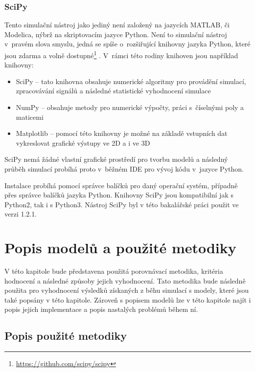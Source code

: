\subsection{SciPy}
\label{chapter-scipy}
Tento simulační nástroj jako jediný není založený na jazycích MATLAB, či Modelica, nýbrž na skriptovacím jazyce Python. Není to simulační nástroj v~pravém slova smyslu, jedná se spíše o~rozšiřující knihovny jazyka Python, které jsou zdarma a volně dostupné\footnote{\url{https://github.com/scipy/scipy}} \cite{scipy}. V~rámci této rodiny knihoven jsou například knihovny:
\begin{itemize}
    \item SciPy -- tato knihovna obsahuje numerické algoritmy pro provádění simulací, zpracovávání signálů a následné statistické vyhodnocení simulace
    \item NumPy -- obsahuje metody pro numerické výpočty, práci s~číselnými poly a maticemi
    \item Matplotlib -- pomocí této knihovny je možné na základě vstupních dat vykreslovat grafické výstupy ve 2D a i ve 3D
\end{itemize}

SciPy nemá žádné vlastní grafické prostředí pro tvorbu modelů a následný průběh simulací probíhá proto v~běžném IDE pro vývoj kódu v~jazyce Python. 

Instalace probíhá pomocí správce balíčků pro daný operační systém, případně přes správce balíčků jazyka Python. Knihovny SciPy jsou kompatibilní jak s Python2, tak i s Python3. Nástroj SciPy byl v této bakalářské práci použit ve verzi 1.2.1.

\chapter{Popis modelů a použité metodiky}
\label{kapitola4}
V této kapitole bude představena použitá porovnávací metodika, kritéria hodnocení a následné způsoby jejich vyhodnocení. Tato metodika bude následně použita pro vyhodnocení výsledků získaných z běhu simulací s modely, které jsou také popsány v této kapitole. Zároveň s popisem modelů lze v této kapitole najít i popis jejich implementace a popis nastalých problémů během ní.

\section{Popis použité metodiky}

